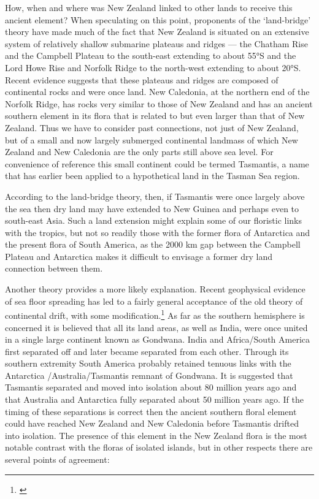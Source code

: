 How, when and where was New Zealand linked to other lands to receive this ancient element? When speculating on this point, proponents of the `land-bridge' theory have made much of the fact that New Zealand is situated on an extensive system of relatively shallow submarine plateaus and ridges --- the Chatham Rise and the Campbell Plateau to the south-east extending to about 55°S and the Lord Howe Rise and Norfolk Ridge to the north-west extending to about 20°S.
Recent evidence suggests that these plateaus and ridges are composed of continental rocks and were once land.
New Caledonia, at the northern end of the Norfolk Ridge, has rocks very similar to those of New Zealand and has an ancient southern element in its flora that is related to but even larger than that of New Zealand.
Thus we have to consider past connections, not just of New Zealand, but of a small and now largely submerged continental landmass of which New Zealand and New Caledonia are the only parts still above sea level.
For convenience of reference this small continent could be termed Tasmantis, a name that has earlier been applied to a hypothetical land in the Tasman Sea region.

According to the land-bridge theory, then, if Tasmantis were once largely above the sea then dry land may have extended to New Guinea and perhaps even to south-east Asia.
Such a land extension might explain some of our floristic links with the tropics, but not so readily those with the former flora of Antarctica and the present flora of South America, as the 2000 km gap between the Campbell Plateau and Antarctica makes it difficult to envisage a former dry land connection between them.

Another theory provides a more likely explanation.
Recent geophysical evidence of sea floor spreading has led to a fairly general acceptance of the old theory of continental drift, with some modification.\footnote{\cite{stevens1980new}}
As far as the southern hemisphere is concerned it is believed that all its land areas, as well as India, were once united in a single large continent known as Gondwana.
India and Africa/South America first separated off and later became separated from each other.
Through its southern extremity South America probably retained tenuous links with the Antarctica /Australia/Tasmantis remnant of Gondwana.
It is suggested that Tasmantis separated and moved into isolation about 80 million years ago and that Australia and Antarctica fully separated about 50 million years ago.
If the timing of these separations is correct then the ancient southern floral element could have reached New Zealand and New Caledonia before Tasmantis drifted into isolation.
The presence of this element in the New Zealand flora is the most notable contrast with the floras of isolated islands, but in other respects there are several points of agreement:

